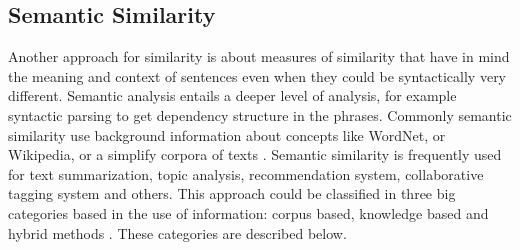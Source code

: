 \documentclass[12pt]{report}
\begin{document}
\subsection{Semantic Similarity} \label{sem_sim}
Another approach for similarity  is about measures of similarity that  have in mind the meaning and context of sentences  even when they could be syntactically very different. Semantic analysis entails a deeper level of analysis, for example syntactic parsing to get dependency structure in the phrases. Commonly semantic similarity use background information about concepts like WordNet, or Wikipedia,  or a simplify corpora of texts  \cite{Ganesan2015} \cite{ Zhang2015}.
Semantic similarity is frequently used for text summarization, topic analysis, recommendation system, collaborative tagging system and others. This approach could be classified in three big categories based in the use of information: corpus based,  knowledge based and hybrid methods \cite{Gomaa2013} \cite{Zhang2015}. These categories are described below.
\end{document}
